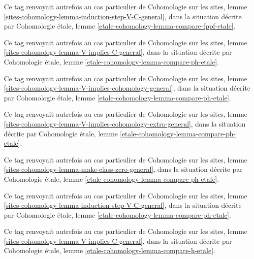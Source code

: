 \begin{remark}
\label{remark-induction-step-V-C-etale-fppf}
Ce tag renvoyait autrefois au cas particulier de
Cohomologie sur les sites, lemme
\ref{sites-cohomology-lemma-induction-step-V-C-general}, dans la situation
décrite par Cohomologie étale, lemme
\ref{etale-cohomology-lemma-compare-fppf-etale}.
\end{remark}

\begin{remark}
\label{remark-V-implies-C-etale-ph}
Ce tag renvoyait autrefois au cas particulier de
Cohomologie sur les sites, lemme
\ref{sites-cohomology-lemma-V-implies-C-general}, dans la situation décrite
par Cohomologie étale, lemme
\ref{etale-cohomology-lemma-compare-ph-etale}.
\end{remark}

\begin{remark}
\label{remark-V-implies-cohomology-etale-ph}
Ce tag renvoyait autrefois au cas particulier de
Cohomologie sur les sites, lemme
\ref{sites-cohomology-lemma-V-implies-cohomology-general}, dans la situation
décrite par Cohomologie étale, lemme
\ref{etale-cohomology-lemma-compare-ph-etale}.
\end{remark}

\begin{remark}
\label{remark-V-implies-cohomology-etale-ph-extra}
Ce tag renvoyait autrefois au cas particulier de
Cohomologie sur les sites, lemme
\ref{sites-cohomology-lemma-V-implies-cohomology-extra-general}, dans la
situation décrite par Cohomologie étale, lemme
\ref{etale-cohomology-lemma-compare-ph-etale}.
\end{remark}

\begin{remark}
\label{remark-make-class-zero}
Ce tag renvoyait autrefois au cas particulier de
Cohomologie sur les sites, lemme
\ref{sites-cohomology-lemma-make-class-zero-general}, dans la situation
décrite par Cohomologie étale, lemme
\ref{etale-cohomology-lemma-compare-ph-etale}.
\end{remark}

\begin{remark}
\label{remark-induction-step-V-C-etale-ph}
Ce tag renvoyait autrefois au cas particulier de
Cohomologie sur les sites, lemme
\ref{sites-cohomology-lemma-induction-step-V-C-general}, dans la situation
décrite par Cohomologie étale, lemme
\ref{etale-cohomology-lemma-compare-ph-etale}.
\end{remark}

\begin{remark}
\label{remark-V-implies-C-etale-h}
Ce tag renvoyait autrefois au cas particulier de
Cohomologie sur les sites, lemme
\ref{sites-cohomology-lemma-V-implies-C-general}, dans la situation décrite
par Cohomologie étale, lemme
\ref{etale-cohomology-lemma-compare-h-etale}.
\end{remark}

